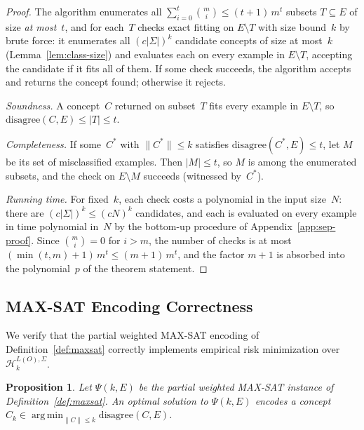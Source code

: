 \documentclass[accepted]{uai2026} %
\newtheorem{proposition}[theorem]{Proposition}
\theoremstyle{definition}
\theoremstyle{remark}
\newcommand{\disagree}{\mathrm{disagree}}
\DeclareMathOperator*{\argmin}{arg\,min}
\begin{document}
\begin{proof}
The algorithm enumerates all
$\sum_{i=0}^{t}\binom{m}{i} \leq (t{+}1)\, m^t$ subsets
$T \subseteq E$ of size \emph{at most}~$t$, and for each~$T$
checks exact fitting on $E \setminus T$ with size bound~$k$ by
brute force: it enumerates all $(c|\Sigma|)^k$ candidate
concepts of size at most~$k$ (Lemma~\ref{lem:class-size}) and
evaluates each on every example in $E \setminus T$, accepting
the candidate if it fits all of them. If some check succeeds,
the algorithm accepts and returns the concept found; otherwise
it rejects.

\emph{Soundness.} A concept~$C$ returned on subset~$T$ fits
every example in $E \setminus T$, so
$\disagree(C, E) \leq |T| \leq t$.

\emph{Completeness.} If some~$C^*$ with $\|C^*\| \leq k$
satisfies $\disagree(C^*, E) \leq t$, let $M$ be its set of
misclassified examples. Then $|M| \leq t$, so $M$ is among the
enumerated subsets, and the check on $E \setminus M$
succeeds (witnessed by~$C^*$).

\emph{Running time.} For fixed~$k$, each check costs a
polynomial in the input size~$N$: there are
$(c|\Sigma|)^k \leq (cN)^k$ candidates, and each is evaluated
on every example in time polynomial in~$N$ by the bottom-up
procedure of Appendix~\ref{app:sep-proof}. Since
$\binom{m}{i} = 0$ for $i > m$, the number of checks is at most
$(\min(t,m){+}1)\, m^t \leq (m{+}1)\, m^t$, and the factor
$m{+}1$ is absorbed into the polynomial~$p$ of the theorem
statement.
\end{proof}

\subsection{MAX-SAT Encoding Correctness}\label{app:maxsat-correct}

We verify that the partial weighted MAX-SAT
encoding of Definition~\ref{def:maxsat} correctly implements
empirical risk minimization over $\mathcal{H}_k^{L(O),\Sigma}$.

\begin{proposition}\label{prop:maxsat-correct}
  Let $\Psi(k, E)$ be the partial weighted MAX-SAT
  instance of Definition~\ref{def:maxsat}. An optimal solution
  to $\Psi(k, E)$ encodes a concept
  $\hat{C}_k \in \argmin_{\|C\| \leq k} \disagree(C, E)$.
\end{proposition}
\end{document}
